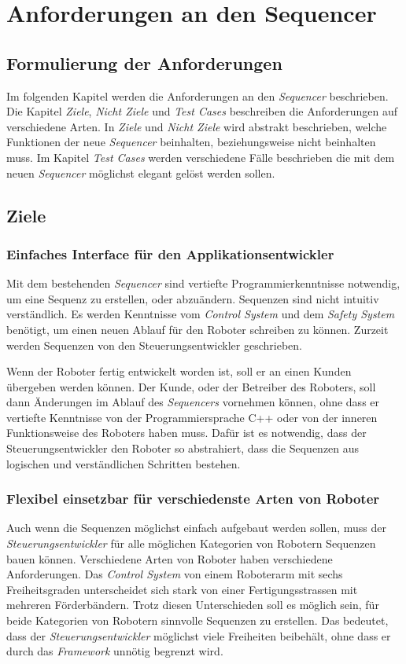 \chapter{Anforderungen an den Sequencer}
\section{Formulierung der Anforderungen}
Im folgenden Kapitel werden die Anforderungen an den \textit{Sequencer} beschrieben.
Die Kapitel \textit{Ziele}, \textit{Nicht Ziele} und \textit{Test Cases} beschreiben die Anforderungen auf verschiedene Arten.
In \textit{Ziele} und \textit{Nicht Ziele} wird abstrakt beschrieben, welche Funktionen der neue \textit{Sequencer} beinhalten, beziehungsweise nicht beinhalten muss.
Im Kapitel \textit{Test Cases} werden verschiedene Fälle beschrieben die mit dem neuen \textit{Sequencer} möglichst elegant gelöst werden sollen.



\section{Ziele}
\subsection{Einfaches Interface für den Applikationsentwickler}
Mit dem bestehenden \textit{Sequencer} sind vertiefte Programmierkenntnisse notwendig, um eine Sequenz zu erstellen, oder abzuändern.
Sequenzen sind nicht intuitiv verständlich.
Es werden Kenntnisse vom \textit{Control System} und dem \textit{Safety System} benötigt, um einen neuen Ablauf für den Roboter schreiben zu können. %
Zurzeit werden Sequenzen von den Steuerungsentwickler geschrieben.

Wenn der Roboter fertig entwickelt worden ist, soll er an einen Kunden übergeben werden können.
Der Kunde, oder der Betreiber des Roboters, soll dann Änderungen im Ablauf des \textit{Sequencers} vornehmen können, ohne dass er vertiefte Kenntnisse von der Programmiersprache C++ oder von der inneren Funktionsweise des Roboters haben muss.
Dafür ist es notwendig, dass der Steuerungsentwickler den Roboter so abstrahiert, dass die Sequenzen aus logischen und verständlichen Schritten bestehen.


\subsection{Flexibel einsetzbar für verschiedenste Arten von Roboter}
Auch wenn die Sequenzen möglichst einfach aufgebaut werden sollen, muss der \textit{Steuerungsentwickler} für alle möglichen Kategorien von Robotern Sequenzen bauen können.
Verschiedene Arten von Roboter haben verschiedene Anforderungen.
Das \textit{Control System} von einem Roboterarm mit sechs Freiheitsgraden unterscheidet sich stark von einer Fertigungsstrassen mit mehreren Förderbändern.
Trotz diesen Unterschieden soll es möglich sein, für beide Kategorien von Robotern sinnvolle Sequenzen zu erstellen.
Das bedeutet, dass der \textit{Steuerungsentwickler} möglichst viele Freiheiten beibehält, ohne dass er durch das \textit{Framework} unnötig begrenzt wird.


